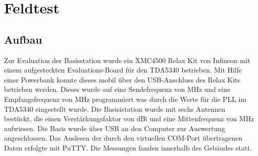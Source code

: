 \chapter{Feldtest}
\label{sec:Feldtest}
\pagestyle{scrheadings}
\section{Aufbau}
Zur Evaluation der Basisstation wurde ein  XMC4500 Relax Kit von Infineon mit einem aufgesteckten Evaluations-Board für den TDA5340 betrieben. Mit Hilfe einer Powerbank konnte dieses mobil über den \ac{USB}-Anschluss des Relax Kits betrieben werden.
Dieses wurde auf eine Sendefrequenz von \unit[868,0]{MHz} und eine Empfangsfrequenz von \unit[867,999]{MHz} programmiert was durch die Werte für die \ac{PLL} im TDA5340 eingestellt wurde. 
Die Basisistation wurde mit sechs Antennen bestückt, die einen Verstärkungsfaktor von \unit[3,6]{dBi} und eine Mittenfrequenz von \unit[868]{MHz} aufwiesen. Die Basis wurde über \ac{USB} an den Computer zur Auswertung angeschlossen. Das Auslesen der durch den virtuellen COM-Port übertragenen Daten erfolgte mit  PuTTY. Die Messungen fanden innerhalb des Gebäudes statt.


